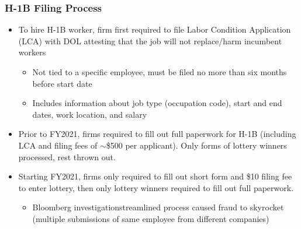 \documentclass[xcolor=dvipsnames, compress, 12pt, aspectratio=169, handout]{beamer}
\begin{document}
\begin{frame}\label{h1bfiling}
    \frametitle{H-1B Filing Process \hyperlink{data}{}}
        \begin{itemize}
            \item To hire H-1B worker, firm first required to file Labor Condition Application (LCA) with DOL attesting that the job will not replace/harm incumbent workers
            \begin{itemize}
                \item Not tied to a specific employee, must be filed no more than six months before start date
                \item Includes information about job type (occupation code), start and end dates, work location, and salary
            \end{itemize}
            \item Prior to FY2021, firms required to fill out full paperwork for H-1B (including LCA and filing fees of $\sim$\$500 per applicant). Only forms of lottery winners processed, rest thrown out. 
            \item Starting FY2021, firms only required to fill out short form and \$10 filing fee to enter lottery, then only lottery winners required to fill out full paperwork. 
            \begin{itemize}
                \item Bloomberg investigation\textemdash streamlined process caused fraud to skyrocket (multiple submissions of same employee from different companies)
            \end{itemize}
        \end{itemize}
\end{frame}
\end{document}
